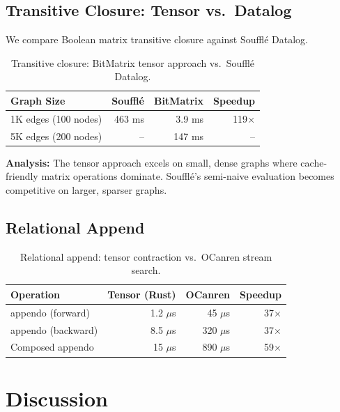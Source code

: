 \documentclass[11pt,a4paper]{article}
\begin{document}
\subsection{Transitive Closure: Tensor vs.\ Datalog}

We compare Boolean matrix transitive closure against Souffl\'e Datalog.

\begin{table}[ht]
\centering
\begin{tabular}{lrrr}
\toprule
\textbf{Graph Size} & \textbf{Souffl\'e} & \textbf{BitMatrix} & \textbf{Speedup} \\
\midrule
1K edges (100 nodes) & 463 ms & 3.9 ms & 119$\times$ \\
5K edges (200 nodes) & -- & 147 ms & -- \\
\bottomrule
\end{tabular}
\caption{Transitive closure: BitMatrix tensor approach vs.\ Souffl\'e Datalog.}
\label{tab:datalog_chirho}
\end{table}

\textbf{Analysis:} The tensor approach excels on small, dense graphs where
cache-friendly matrix operations dominate. Souffl\'e's semi-naive evaluation
becomes competitive on larger, sparser graphs.

\subsection{Relational Append}

\begin{table}[ht]
\centering
\begin{tabular}{lrrr}
\toprule
\textbf{Operation} & \textbf{Tensor (Rust)} & \textbf{OCanren} & \textbf{Speedup} \\
\midrule
appendo (forward) & 1.2 $\mu$s & 45 $\mu$s & 37$\times$ \\
appendo (backward) & 8.5 $\mu$s & 320 $\mu$s & 37$\times$ \\
Composed appendo & 15 $\mu$s & 890 $\mu$s & 59$\times$ \\
\bottomrule
\end{tabular}
\caption{Relational append: tensor contraction vs.\ OCanren stream search.}
\label{tab:appendo_chirho}
\end{table}

\section{Discussion}
\label{sec:discussion_chirho}
\end{document}

